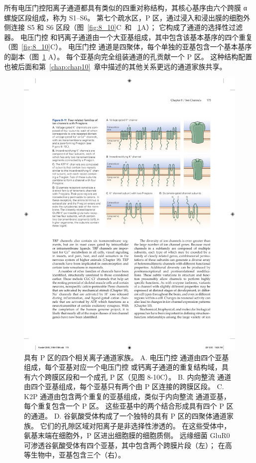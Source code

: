 所有电压门控阳离子通道都具有类似的四重对称结构，其核心基序由六个跨膜 α 螺旋区段组成，称为 S1–S6。
第七个疏水区，P 区，通过浸入和浸出膜的细胞外侧连接 S5 和 S6 区段（图~\ref{fig:8_10}C~和 ~\ref{fig:8_11}A）；
它构成了通道的选择性过滤器。
电压门控  和钙离子通道由一个大亚基组成，其中包含该基本基序的四个重复（图~\ref{fig:8_10}C）。 
电压门控  通道是四聚体，每个单独的亚基包含一个基本基序的副本（图~\ref{fig:8_11} A）。
每个亚基向完全组装通道的孔贡献一个 P 区。
这种结构配置也被后面和第~\ref{chap:chap10}~章中描述的其他关系更远的通道家族共享。


\begin{figure}[htbp]
	\centering
	\includegraphics[width=0.7\linewidth]{chap08/fig_8_11}
	\caption{具有 P 区的四个相关离子通道家族。 A. 电压门控  通道由四个亚基组成，每个亚基对应一个电压门控  或钙离子通道的重复结构域，具有六个跨膜区段和一个成孔 P 区（见图 8-10C）。 B. 内向整流  通道由四个亚基组成，每个亚基只有两个由 P 区连接的跨膜区段。 C. K2P  通道由包含两个重复的亚基组成，类似于内向整流  通道亚基，每个重复包含一个 P 区。 这些亚基中的两个结合形成具有四个 P 区的通道。 D. 谷氨酸受体构成了一个独特的具有 P 区的四聚体通道家族。 它们的孔隙区域对阳离子是非选择性渗透的。 在这些受体中，氨基末端在细胞外，P 区进出细胞膜的细胞质侧。 远缘细菌 GluR0  可渗透谷氨酸受体有四个亚基，其中包含两个跨膜片段（左）； 在高等生物中，亚基包含三个（右）。}
	\label{fig:8_11}
\end{figure}


